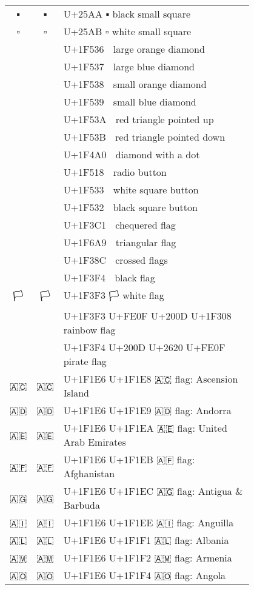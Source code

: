\documentclass[a4paper,12pt]{article}
\newcommand{\fontA}[1]{{\fontspec[RawFeature={mode=harf,+dist,+ccmp}]{Segoe UI Emoji} #1}}
\newcommand{\fontB}[1]{{\fontspec[RawFeature={mode=harf,+dist,+ccmp}]{Noto Color Emoji} #1}}
\begin{document}
\begin{longtable}[c]{ccp{0.8\linewidth}}
\fontA{▪}&\fontB{▪}&U+25AA ▪ black small square\\
\fontA{▫}&\fontB{▫}&U+25AB ▫ white small square\\
\fontA{🔶}&\fontB{🔶}&U+1F536 🔶 large orange diamond\\
\fontA{🔷}&\fontB{🔷}&U+1F537 🔷 large blue diamond\\
\fontA{🔸}&\fontB{🔸}&U+1F538 🔸 small orange diamond\\
\fontA{🔹}&\fontB{🔹}&U+1F539 🔹 small blue diamond\\
\fontA{🔺}&\fontB{🔺}&U+1F53A 🔺 red triangle pointed up\\
\fontA{🔻}&\fontB{🔻}&U+1F53B 🔻 red triangle pointed down\\
\fontA{💠}&\fontB{💠}&U+1F4A0 💠 diamond with a dot\\
\fontA{🔘}&\fontB{🔘}&U+1F518 🔘 radio button\\
\fontA{🔳}&\fontB{🔳}&U+1F533 🔳 white square button\\
\fontA{🔲}&\fontB{🔲}&U+1F532 🔲 black square button\\
\fontA{🏁}&\fontB{🏁}&U+1F3C1 🏁 chequered flag\\
\fontA{🚩}&\fontB{🚩}&U+1F6A9 🚩 triangular flag\\
\fontA{🎌}&\fontB{🎌}&U+1F38C 🎌 crossed flags\\
\fontA{🏴}&\fontB{🏴}&U+1F3F4 🏴 black flag\\
\fontA{🏳}&\fontB{🏳}&U+1F3F3 🏳 white flag\\
\fontA{🏳️‍🌈}&\fontB{🏳️‍🌈}&U+1F3F3 U+FE0F U+200D U+1F308 🏳️‍🌈 rainbow flag\\
\fontA{🏴‍☠️}&\fontB{🏴‍☠️}&U+1F3F4 U+200D U+2620 U+FE0F 🏴‍☠️ pirate flag\\
\fontA{🇦🇨}&\fontB{🇦🇨}&U+1F1E6 U+1F1E8 🇦🇨 flag: Ascension Island\\
\fontA{🇦🇩}&\fontB{🇦🇩}&U+1F1E6 U+1F1E9 🇦🇩 flag: Andorra\\
\fontA{🇦🇪}&\fontB{🇦🇪}&U+1F1E6 U+1F1EA 🇦🇪 flag: United Arab Emirates\\
\fontA{🇦🇫}&\fontB{🇦🇫}&U+1F1E6 U+1F1EB 🇦🇫 flag: Afghanistan\\
\fontA{🇦🇬}&\fontB{🇦🇬}&U+1F1E6 U+1F1EC 🇦🇬 flag: Antigua \& Barbuda\\
\fontA{🇦🇮}&\fontB{🇦🇮}&U+1F1E6 U+1F1EE 🇦🇮 flag: Anguilla\\
\fontA{🇦🇱}&\fontB{🇦🇱}&U+1F1E6 U+1F1F1 🇦🇱 flag: Albania\\
\fontA{🇦🇲}&\fontB{🇦🇲}&U+1F1E6 U+1F1F2 🇦🇲 flag: Armenia\\
\fontA{🇦🇴}&\fontB{🇦🇴}&U+1F1E6 U+1F1F4 🇦🇴 flag: Angola\\

\end{longtable}
\end{document}
